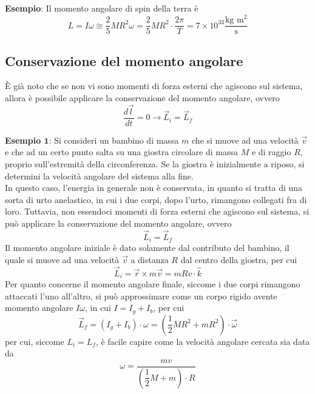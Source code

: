 \documentclass[a4paper]{extarticle}
\begin{document}
\vspace{1em}
\noindent
\textbf{Esempio}: Il momento angolare di spin della terra è
\[L=I\omega \cong \frac{2}{5} M R^2 \omega = \frac{2}{5}M R^2 \cdot \frac{2\pi}{T} = 7 \times 10^{33} \frac{\text{kg m}^2}{\text{s}}\]

\vspace{1em}
\noindent
\subsection{Conservazione del momento angolare}
È già noto che se non vi sono momenti di forza esterni che agiscono sul sistema, allora è possibile applicare la conservazione del momento angolare, ovvero
\[\frac{d \vec l}{dt} = 0 \longrightarrow \vec L_i = \vec L_f\]

\vspace{1em}
\noindent
\textbf{Esempio $\boldsymbol{1}$}: Si consideri un bambino di massa $m$ che si muove ad una velocità $\vec v$ e che ad un certo punto salta su una giostra circolare di massa $M$ e di raggio $R$, proprio sull'estremità della circonferenza. Se la giostra è inizialmente a riposo, si determini la velocità angolare del sistema alla fine.\\
In questo caso, l'energia in generale non è conservata, in quanto si tratta di una sorta di urto anelastico, in cui i due corpi, dopo l'urto, rimangono collegati fra di loro. Tuttavia, non essendoci momenti di forza esterni che agiscono sul sistema, si può applicare la conservazione del momento angolare, ovvero
\[\vec L_i = \vec L_f\]
Il momento angolare iniziale è dato solamente dal contributo del bambino, il quale si muove ad una velocità $\vec v$ a distanza $R$ dal centro della giostra, per cui
\[\vec L_i = \vec r \times m \vec v = m R v \cdot \hat{k}\]
Per quanto concerne il momento angolare finale, siccome i due corpi rimangono attaccati l'uno all'altro, si può approssimare come un corpo rigido avente momento angolare $I \omega$, in cui $I=I_g+I_b$, per cui
\[\vec L_f = (I_g + I_b) \cdot \omega = \left(\frac{1}{2}MR^2 + mR^2\right) \cdot \vec \omega\]
per cui, siccome $L_i=L_f$, è facile capire come la velocità angolare cercata sia data da
\[\omega = \frac{mv}{\left(\dfrac{1}{2}M + m\right) \cdot R}\]
\end{document}
